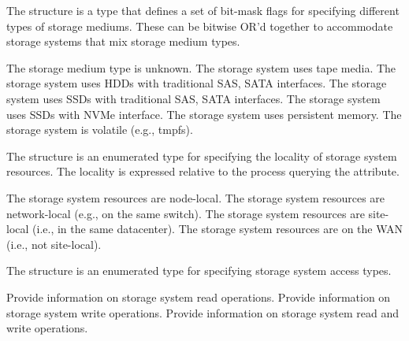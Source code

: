 
The  structure is a  type that defines a set of bit-mask flags for specifying different types of storage mediums. These can be bitwise OR'd together to accommodate storage systems that mix storage medium types.

\begin{constantdesc}
%
The storage medium type is unknown.
%
The storage system uses tape media.
%
The storage system uses HDDs with traditional SAS, SATA interfaces.
%
The storage system uses SSDs with traditional SAS, SATA interfaces.
%
The storage system uses SSDs with NVMe interface.
%
The storage system uses persistent memory.
%
The storage system is volatile (e.g., tmpfs).
%
\end{constantdesc}


The  structure is an enumerated type for specifying the locality of storage system resources. The locality is expressed relative to the process querying the attribute.

\begin{constantdesc}
%
The storage system resources are node-local.
%
The storage system resources are network-local (e.g., on the same switch).
%
The storage system resources are site-local (i.e., in the same datacenter).
%
The storage system resources are on the WAN (i.e., not site-local).
%
\end{constantdesc}



The  structure is an enumerated type for specifying storage system access types.

\begin{constantdesc}
%
Provide information on storage system read operations.
%
Provide information on storage system write operations.
%
Provide information on storage system read and write operations.
%
\end{constantdesc}


